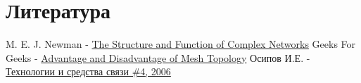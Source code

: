 \documentclass[a4paper]{article}
\begin{document}

\section{Литература}

\begin{thebibliography}{}
      M. E. J. Newman -  \href{https://github.com/julproh/Thesis}{The Structure and Function of Complex Networks}
      Geeks For Geeks -  \href{https://www.geeksforgeeks.org/advantage-and-disadvantage-of-mesh-topology/}{Advantage and Disadvantage of Mesh Topology}
      Осипов И.Е. -  \href{http://lib.tssonline.ru/articles2/fix-op/mesh_seti_techn_prilozh_oborud}{Технологии и средства связи \#4, 2006}
\end{thebibliography}
\end{document}
